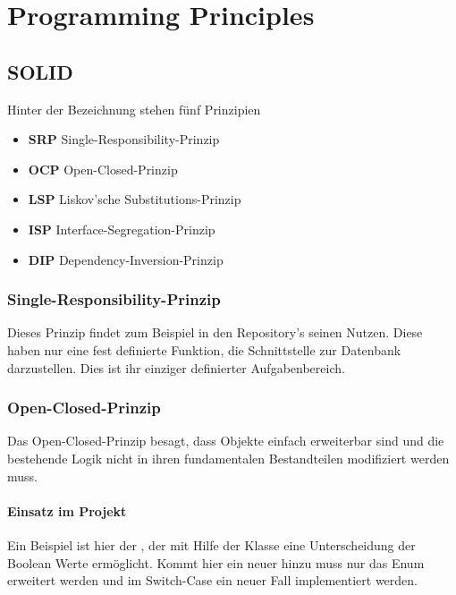 
\chapter{Programming Principles}

	\section{SOLID \cite{solid.servinc}}
	Hinter der Bezeichnung  stehen fünf Prinzipien
	\begin{itemize}
		\item \textbf{SRP} Single-Responsibility-Prinzip
		\item \textbf{OCP} Open-Closed-Prinzip
		\item \textbf{LSP} Liskov’sche Substitutions-Prinzip
		\item \textbf{ISP} Interface-Segregation-Prinzip
		\item \textbf{DIP} Dependency-Inversion-Prinzip
	\end{itemize}
		\subsection{Single-Responsibility-Prinzip}
		Dieses Prinzip findet zum Beispiel in den Repository's seinen Nutzen. Diese haben nur eine fest definierte Funktion, die Schnittstelle zur Datenbank darzustellen. Dies ist ihr einziger definierter Aufgabenbereich.
		
		\subsection{Open-Closed-Prinzip}
		Das Open-Closed-Prinzip besagt, dass Objekte einfach erweiterbar sind und die bestehende Logik nicht in ihren fundamentalen Bestandteilen modifiziert werden muss. 
			\subsubsection{Einsatz im Projekt}
			Ein Beispiel ist hier der , der mit Hilfe der Klasse  eine Unterscheidung der  Boolean Werte ermöglicht. Kommt hier ein neuer hinzu muss nur das Enum erweitert werden und im Switch-Case ein neuer Fall implementiert werden.
		

